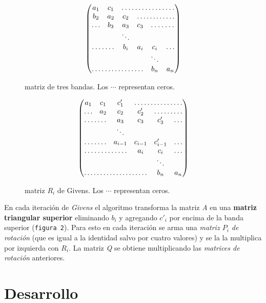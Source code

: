 \documentclass[a4paper]{article}
\begin{document}
\begin{multicols}{2}
\begin{figure}[H]
$$
 \begin{pmatrix}
   a_1 & c_1 & \hdotsfor{4} \\
   b_2 & a_2 &  c_2 & \hdotsfor{3} \\
  \hdots & b_3 & a_3 & c_3 & \hdotsfor{2} \\
   & & \ddots \\
   \hdotsfor{2} & b_i & a_i & c_i & \hdots \\
   & & & & \ddots \\
   \hdotsfor{4} & b_n & a_n \\
 \end{pmatrix}
$$
 \caption{matriz de tres bandas. Los $\cdots$ representan ceros.}
\end{figure}

\begin{figure}[H]
$$
 \begin{pmatrix}
   a_1 & c_1 & c'_1 & \hdotsfor{3} \\
   \hdots & a_2 &  c_2 & c'_2 &\hdotsfor{2} \\
   \hdotsfor{2} & a_3 & c_3 & c'_3 & \hdots \\
   & & \ddots \\
   \hdotsfor{2} & a_{i - 1} & c_{i - 1} & c'_{i - 1} & \hdots \\
   \hdotsfor{3} & a_i & c_i & \hdots \\
   & & & & \ddots \\
   \hdotsfor{4} & b_n & a_n \\
 \end{pmatrix}
$$
 \caption{matriz $R_i$ de Givens. Los $\cdots$ representan ceros.}
\end{figure}
\end{multicols}

En cada iteración de \textit{Givens} el algoritmo transforma la matriz \textit{A} en una \textbf{matriz triangular superior} eliminando $b_i$ y agregando $c'_i$ por encima de la banda superior (\texttt{figura 2}). Para esto en cada iteración se arma una \textit{matriz $P_i$ de rotación} (que es igual a la identidad salvo por cuatro valores) y se la la multiplica por izquierda con $R_i$. La matriz \textit{Q} se obtiene multiplicando las \textit{matrices de rotación} anteriores.\\



\section{Desarrollo}
\end{document}

